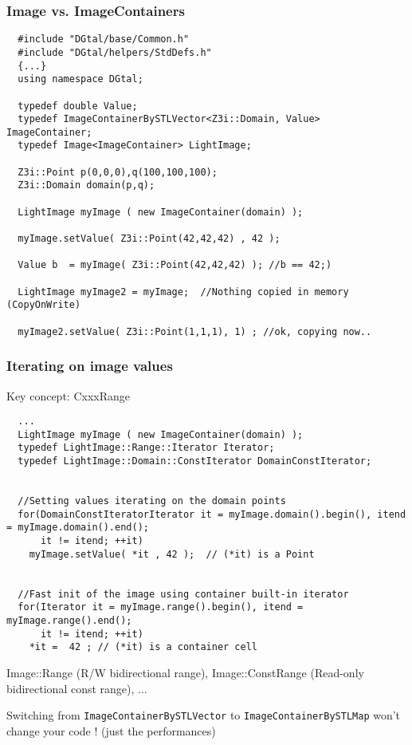 \documentclass[8pt]{beamer}
\begin{document}
\begin{frame}[containsverbatim]
  \frametitle{Image vs. ImageContainers}

  
\begin{lstlisting}
  #include "DGtal/base/Common.h"
  #include "DGtal/helpers/StdDefs.h"
  {...}
  using namespace DGtal;

  typedef double Value; 
  typedef ImageContainerBySTLVector<Z3i::Domain, Value> ImageContainer;
  typedef Image<ImageContainer> LightImage;

  Z3i::Point p(0,0,0),q(100,100,100);
  Z3i::Domain domain(p,q);
  
  LightImage myImage ( new ImageContainer(domain) );
  
  myImage.setValue( Z3i::Point(42,42,42) , 42 );
  
  Value b  = myImage( Z3i::Point(42,42,42) ); //b == 42;)

  LightImage myImage2 = myImage;  //Nothing copied in memory (CopyOnWrite)

  myImage2.setValue( Z3i::Point(1,1,1), 1) ; //ok, copying now..

\end{lstlisting}
\end{frame}

\begin{frame}[containsverbatim]
  \frametitle{Iterating on image values}
Key concept: CxxxRange
\begin{lstlisting}
  ...
  LightImage myImage ( new ImageContainer(domain) );
  typedef LightImage::Range::Iterator Iterator;
  typedef LightImage::Domain::ConstIterator DomainConstIterator;


  //Setting values iterating on the domain points
  for(DomainConstIteratorIterator it = myImage.domain().begin(), itend = myImage.domain().end();
      it != itend; ++it)
    myImage.setValue( *it , 42 );  // (*it) is a Point
    

  //Fast init of the image using container built-in iterator 
  for(Iterator it = myImage.range().begin(), itend = myImage.range().end();
      it != itend; ++it)
    *it =  42 ; // (*it) is a container cell
\end{lstlisting}

Image::Range (R/W bidirectional range), Image::ConstRange (Read-only
bidirectional const range), ...

\begin{alertblock}{}\small
  \alert{Switching from \texttt{ImageContainerBySTLVector} to
    \texttt{ImageContainerBySTLMap} won't change your code  ! (just the
    performances)}
\end{alertblock}
\end{frame}
\end{document}
